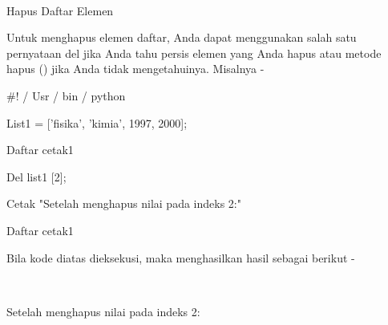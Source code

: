 \documentclass[a4paper,12pt]{report}
\begin{document}
\vspace{14pt}
\noindent 
{\fontsize{14pt}{14pt} \\} \par
\vspace{14pt}
\noindent 
{\fontsize{14pt}{14pt}\selectfont Hapus Daftar Elemen \\} \par
\vspace{14pt}
\noindent 
{\fontsize{14pt}{14pt}\selectfont Untuk menghapus elemen daftar, Anda dapat menggunakan salah satu pernyataan del jika Anda tahu persis elemen yang Anda hapus atau metode hapus () jika Anda tidak mengetahuinya. Misalnya - \\} \par
\vspace{14pt}
\noindent 
{\fontsize{14pt}{14pt}\selectfont  $  \#  $! / Usr / bin / python \\} \par
\vspace{14pt}
\noindent 
{\fontsize{14pt}{14pt}\selectfont List1 = ['fisika', 'kimia', 1997, 2000]; \\} \par
\vspace{14pt}
\noindent 
{\fontsize{14pt}{14pt}\selectfont Daftar cetak1 \\} \par
\vspace{14pt}
\noindent 
{\fontsize{14pt}{14pt}\selectfont Del list1 [2]; \\} \par
\vspace{14pt}
\noindent 
{\fontsize{14pt}{14pt}\selectfont Cetak "Setelah menghapus nilai pada indeks 2:" \\} \par
\vspace{14pt}
\noindent 
{\fontsize{14pt}{14pt}\selectfont Daftar cetak1 \\} \par
\noindent 
{\fontsize{14pt}{14pt}\selectfont Bila kode diatas dieksekusi, maka menghasilkan hasil sebagai berikut - \\} \par
\noindent 
{\fontsize{14pt}{14pt} \\} \par
\noindent 
{\fontsize{14pt}{14pt}\selectfont Setelah menghapus nilai pada indeks 2: \\} \par
\end{document}
